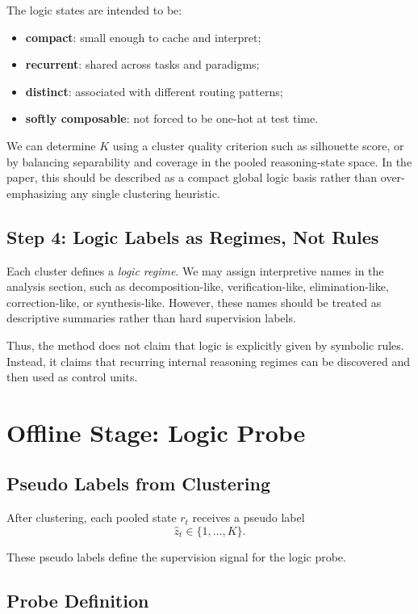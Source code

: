\documentclass[11pt]{article}
\begin{document}
The logic states are intended to be:
\begin{itemize}[leftmargin=1.5em]
    \item \textbf{compact}: small enough to cache and interpret;
    \item \textbf{recurrent}: shared across tasks and paradigms;
    \item \textbf{distinct}: associated with different routing patterns;
    \item \textbf{softly composable}: not forced to be one-hot at test time.
\end{itemize}

We can determine $K$ using a cluster quality criterion such as silhouette score, or by balancing separability and coverage in the pooled reasoning-state space. In the paper, this should be described as a compact global logic basis rather than over-emphasizing any single clustering heuristic.

\subsection{Step 4: Logic Labels as Regimes, Not Rules}

Each cluster defines a \emph{logic regime}. We may assign interpretive names in the analysis section, such as decomposition-like, verification-like, elimination-like, correction-like, or synthesis-like. However, these names should be treated as descriptive summaries rather than hard supervision labels.

Thus, the method does not claim that logic is explicitly given by symbolic rules. Instead, it claims that recurring internal reasoning regimes can be discovered and then used as control units.

\section{Offline Stage: Logic Probe}

\subsection{Pseudo Labels from Clustering}

After clustering, each pooled state $r_t$ receives a pseudo label
\[
\hat{z}_t \in \{1,\dots,K\}.
\]

These pseudo labels define the supervision signal for the logic probe.

\subsection{Probe Definition}
\end{document}
